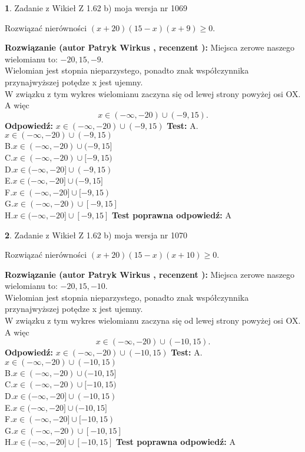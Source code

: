 \documentclass[12pt, a4paper]{article}
\theoremstyle{definition} %
\newtheorem{zad}{}
\newcommand{\zadStart}[1]{\begin{zad}#1\newline}
\newcommand{\zadStop}{\end{zad}}
\newcommand{\rozwStart}[2]{\noindent \textbf{Rozwiązanie (autor #1 , recenzent #2): }\newline}
\newcommand{\rozwStop}{\newline}
\newcommand{\odpStart}{\noindent \textbf{Odpowiedź:}\newline}
\newcommand{\odpStop}{\newline}
\newcommand{\testStart}{\noindent \textbf{Test:}\newline}
\newcommand{\testStop}{\newline}
\newcommand{\kluczStart}{\noindent \textbf{Test poprawna odpowiedź:}\newline}
\newcommand{\kluczStop}{\newline}
\begin{document}
\zadStart{Zadanie z Wikieł Z 1.62 b) moja wersja nr 1069}

Rozwiązać nierówności $(x+20)(15-x)(x+9)\ge0$.
\zadStop
\rozwStart{Patryk Wirkus}{}
Miejsca zerowe naszego wielomianu to: $-20, 15, -9$.\\
Wielomian jest stopnia nieparzystego, ponadto znak współczynnika przy\linebreak najwyższej potędze x jest ujemny.\\ W związku z tym wykres wielomianu zaczyna się od lewej strony powyżej osi OX. A więc $$x \in (-\infty,-20) \cup (-9,15).$$
\rozwStop
\odpStart
$x \in (-\infty,-20) \cup (-9,15)$
\odpStop
\testStart
A.$x \in (-\infty,-20) \cup (-9,15)$\\
B.$x \in (-\infty,-20) \cup (-9,15]$\\
C.$x \in (-\infty,-20) \cup [-9,15)$\\
D.$x \in (-\infty,-20] \cup (-9,15)$\\
E.$x \in (-\infty,-20] \cup (-9,15]$\\
F.$x \in (-\infty,-20] \cup [-9,15)$\\
G.$x \in (-\infty,-20) \cup [-9,15]$\\
H.$x \in (-\infty,-20] \cup [-9,15]$
\testStop
\kluczStart
A
\kluczStop



\zadStart{Zadanie z Wikieł Z 1.62 b) moja wersja nr 1070}

Rozwiązać nierówności $(x+20)(15-x)(x+10)\ge0$.
\zadStop
\rozwStart{Patryk Wirkus}{}
Miejsca zerowe naszego wielomianu to: $-20, 15, -10$.\\
Wielomian jest stopnia nieparzystego, ponadto znak współczynnika przy\linebreak najwyższej potędze x jest ujemny.\\ W związku z tym wykres wielomianu zaczyna się od lewej strony powyżej osi OX. A więc $$x \in (-\infty,-20) \cup (-10,15).$$
\rozwStop
\odpStart
$x \in (-\infty,-20) \cup (-10,15)$
\odpStop
\testStart
A.$x \in (-\infty,-20) \cup (-10,15)$\\
B.$x \in (-\infty,-20) \cup (-10,15]$\\
C.$x \in (-\infty,-20) \cup [-10,15)$\\
D.$x \in (-\infty,-20] \cup (-10,15)$\\
E.$x \in (-\infty,-20] \cup (-10,15]$\\
F.$x \in (-\infty,-20] \cup [-10,15)$\\
G.$x \in (-\infty,-20) \cup [-10,15]$\\
H.$x \in (-\infty,-20] \cup [-10,15]$
\testStop
\kluczStart
A
\kluczStop
\end{document}

